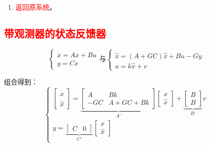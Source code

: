 \documentclass[
12pt, %
a4paper, 
oneside, %
]{scrartcl}
\begin{document}
\begin{enumerate}
\begin{enumerate}
\item $ x $的估计为$ \textcolor{red}{\hat{x} = \begin{bmatrix} z \\ y \end{bmatrix} = \begin{bmatrix} I \\ 0 \end{bmatrix} w + \begin{bmatrix} -G \\ I \end{bmatrix} y} $。
\end{enumerate}
\item \textcolor{red}{返回原系统}。
\end{enumerate}
\subsection[带观测器的状态反馈器]{\textcolor{red}{带观测器的状态反馈器}}
$$ \begin{cases} \dot{x} = A x + B u \\ y = C x \end{cases} \text{与} \begin{cases} \dot{\hat{x}} = (A + G C)\hat{x} + B u - G y \\ u = k \hat{x} + v \end{cases} $$

组合得到：
$$ \begin{cases} \begin{bmatrix} \dot{x} \\ \dot{\hat{x}} \end{bmatrix} = \underbrace{\begin{bmatrix} A & B k \\ -G C & A + G C + B k \end{bmatrix}}_{A'} \begin{bmatrix} x \\ \hat{x} \end{bmatrix} + \underbrace{\begin{bmatrix} B \\ B \end{bmatrix}}_{B'} v \\ y = \underbrace{\begin{bmatrix} C & 0 \end{bmatrix}}_{C'} \begin{bmatrix} x \\ \hat{x} \end{bmatrix} \end{cases} $$
\end{document}
